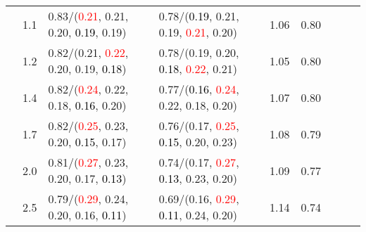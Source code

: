 \documentclass[10pt,a4paper]{report}
\begin{document}
\begin{table}[!htbp]
\begin{center}
{\begin{tabular}{ccllccccc}
				  & 1.1                               & 0.83/(\textcolor{red}{0.21}, 0.21, 0.20, \textcolor{black}{0.19}, 0.19)                                                                                                                       & 0.78/(\textcolor{black}{0.19}, 0.21, 0.19, \textcolor{red}{0.21}, 0.20)                                                                                                                       & 1.06             & 0.80                     \\
				  & 1.2                               & 0.82/(0.21, \textcolor{red}{0.22}, 0.20, 0.19, \textcolor{black}{0.18})                                                                                                                       & 0.78/(0.19, 0.20, \textcolor{black}{0.18}, \textcolor{red}{0.22}, 0.21)                                                                                                                       & 1.05             & 0.80                     \\
				  & 1.4                               & 0.82/(\textcolor{red}{0.24}, 0.22, 0.18, \textcolor{black}{0.16}, 0.20)                                                                                                                       & 0.77/(\textcolor{black}{0.16}, \textcolor{red}{0.24}, 0.22, 0.18, 0.20)                                                                                                                       & 1.07             & 0.80                     \\
				  & 1.7                               & 0.82/(\textcolor{red}{0.25}, 0.23, 0.20, \textcolor{black}{0.15}, 0.17)                                                                                                                       & 0.76/(0.17, \textcolor{red}{0.25}, \textcolor{black}{0.15}, 0.20, 0.23)                                                                                                                       & 1.08             & 0.79                     \\
				  & 2.0                               & 0.81/(\textcolor{red}{0.27}, 0.23, 0.20, 0.17, \textcolor{black}{0.13})                                                                                                                       & 0.74/(0.17, \textcolor{red}{0.27}, \textcolor{black}{0.13}, 0.23, 0.20)                                                                                                                       & 1.09             & 0.77                     \\
				  & 2.5                               & 0.79/(\textcolor{red}{0.29}, 0.24, 0.20, 0.16, \textcolor{black}{0.11})                                                                                                                       & 0.69/(0.16, \textcolor{red}{0.29}, \textcolor{black}{0.11}, 0.24, 0.20)                                                                                                                       & 1.14             & 0.74                     \\

\end{tabular}}
\end{center}
\end{table}
\end{document}
